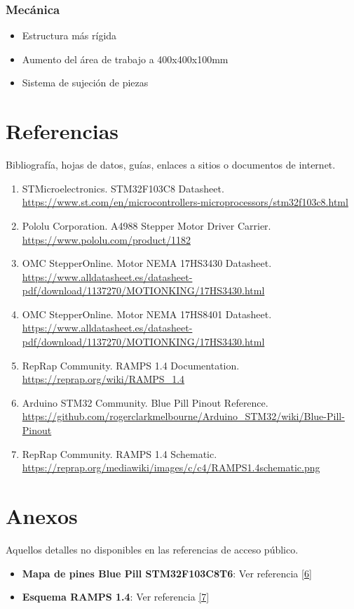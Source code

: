 \documentclass[12pt]{article}
\begin{document}
\subsubsection{Mecánica}
\begin{itemize}
    \item Estructura más rígida 
    \item Aumento del área de trabajo a 400x400x100mm
    \item Sistema de sujeción de piezas
\end{itemize}

\section{Referencias}
Bibliografía, hojas de datos, guías, enlaces a sitios o documentos de internet.

\begin{enumerate}
  \item \label{ref1} STMicroelectronics. STM32F103C8 Datasheet. \\
  \url{https://www.st.com/en/microcontrollers-microprocessors/stm32f103c8.html}
  
  \item \label{ref2} Pololu Corporation. A4988 Stepper Motor Driver Carrier. \\
  \url{https://www.pololu.com/product/1182}
  
  \item \label{ref3} OMC StepperOnline. Motor NEMA 17HS3430 Datasheet. \\
  \url{https://www.alldatasheet.es/datasheet-pdf/download/1137270/MOTIONKING/17HS3430.html}
  
  \item \label{ref4} OMC StepperOnline. Motor NEMA 17HS8401 Datasheet. \\
  \url{https://www.alldatasheet.es/datasheet-pdf/download/1137270/MOTIONKING/17HS3430.html}
  
  \item \label{ref5} RepRap Community. RAMPS 1.4 Documentation. \\
  \url{https://reprap.org/wiki/RAMPS_1.4}
  
  \item \label{ref6} Arduino STM32 Community. Blue Pill Pinout Reference. \\
  \url{https://github.com/rogerclarkmelbourne/Arduino_STM32/wiki/Blue-Pill-Pinout}
  
  \item \label{ref7} RepRap Community. RAMPS 1.4 Schematic. \\
  \url{https://reprap.org/mediawiki/images/c/c4/RAMPS1.4schematic.png}
\end{enumerate}


\section{Anexos}
Aquellos detalles no disponibles en las referencias de acceso público.

\begin{itemize}
  \item \textbf{Mapa de pines Blue Pill STM32F103C8T6}: Ver referencia \hyperref[ref6]{[6]}
  \item \textbf{Esquema RAMPS 1.4}: Ver referencia \hyperref[ref7]{[7]}
\end{itemize}
\end{document}
